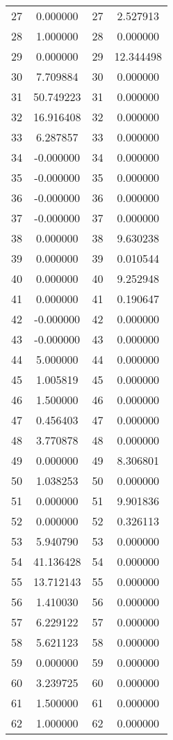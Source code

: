 \documentclass[12pt]{article}
\begin{document}
\begin{longtable}{@{}cccc@{}}
27 & 0.000000 & 27 & 2.527913 \\
28 & 1.000000 & 28 & 0.000000 \\
29 & 0.000000 & 29 & 12.344498 \\
30 & 7.709884 & 30 & 0.000000 \\
31 & 50.749223 & 31 & 0.000000 \\
32 & 16.916408 & 32 & 0.000000 \\
33 & 6.287857 & 33 & 0.000000 \\
34 & -0.000000 & 34 & 0.000000 \\
35 & -0.000000 & 35 & 0.000000 \\
36 & -0.000000 & 36 & 0.000000 \\
37 & -0.000000 & 37 & 0.000000 \\
38 & 0.000000 & 38 & 9.630238 \\
39 & 0.000000 & 39 & 0.010544 \\
40 & 0.000000 & 40 & 9.252948 \\
41 & 0.000000 & 41 & 0.190647 \\
42 & -0.000000 & 42 & 0.000000 \\
43 & -0.000000 & 43 & 0.000000 \\
44 & 5.000000 & 44 & 0.000000 \\
45 & 1.005819 & 45 & 0.000000 \\
46 & 1.500000 & 46 & 0.000000 \\
47 & 0.456403 & 47 & 0.000000 \\
48 & 3.770878 & 48 & 0.000000 \\
49 & 0.000000 & 49 & 8.306801 \\
50 & 1.038253 & 50 & 0.000000 \\
51 & 0.000000 & 51 & 9.901836 \\
52 & 0.000000 & 52 & 0.326113 \\
53 & 5.940790 & 53 & 0.000000 \\
54 & 41.136428 & 54 & 0.000000 \\
55 & 13.712143 & 55 & 0.000000 \\
56 & 1.410030 & 56 & 0.000000 \\
57 & 6.229122 & 57 & 0.000000 \\
58 & 5.621123 & 58 & 0.000000 \\
59 & 0.000000 & 59 & 0.000000 \\
60 & 3.239725 & 60 & 0.000000 \\
61 & 1.500000 & 61 & 0.000000 \\
62 & 1.000000 & 62 & 0.000000 \\

\end{longtable}
\end{document}
